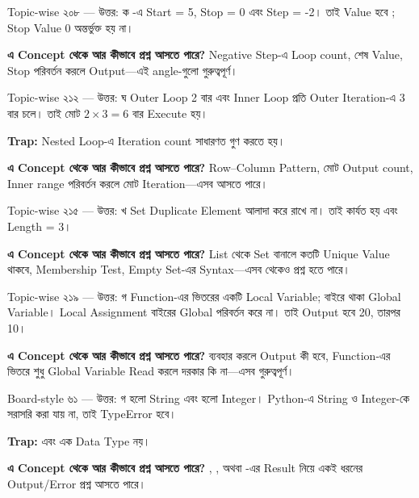 \begin{explainbox}{Topic-wise ২০৮ — উত্তর: ক}
-এ Start = 5, Stop = 0 এবং Step = -2। তাই Value হবে ; Stop Value 0 অন্তর্ভুক্ত হয় না।

\textbf{এ Concept থেকে আর কীভাবে প্রশ্ন আসতে পারে?} Negative Step-এ Loop count, শেষ Value, Stop পরিবর্তন করলে Output—এই angle-গুলো গুরুত্বপূর্ণ।
\end{explainbox}

\begin{explainbox}{Topic-wise ২১২ — উত্তর: ঘ}
Outer Loop 2 বার এবং Inner Loop প্রতি Outer Iteration-এ 3 বার চলে। তাই  মোট \(2 \times 3 = 6\) বার Execute হয়।

\textbf{Trap:} Nested Loop-এ Iteration count সাধারণত গুণ করতে হয়।

\textbf{এ Concept থেকে আর কীভাবে প্রশ্ন আসতে পারে?} Row–Column Pattern, মোট Output count, Inner range পরিবর্তন করলে মোট Iteration—এসব আসতে পারে।
\end{explainbox}

\begin{explainbox}{Topic-wise ২১৫ — উত্তর: খ}
Set Duplicate Element আলাদা করে রাখে না। তাই  কার্যত  হয় এবং Length = 3।

\textbf{এ Concept থেকে আর কীভাবে প্রশ্ন আসতে পারে?} List থেকে Set বানালে কতটি Unique Value থাকবে, Membership Test, Empty Set-এর Syntax—এসব থেকেও প্রশ্ন হতে পারে।
\end{explainbox}

\begin{explainbox}{Topic-wise ২১৯ — উত্তর: গ}
Function-এর ভিতরের  একটি Local Variable; বাইরে থাকা  Global Variable। Local Assignment বাইরের Global  পরিবর্তন করে না। তাই Output হবে 20, তারপর 10।

\textbf{এ Concept থেকে আর কীভাবে প্রশ্ন আসতে পারে?}  ব্যবহার করলে Output কী হবে, Function-এর ভিতরে শুধু Global Variable Read করলে  দরকার কি না—এসব গুরুত্বপূর্ণ।
\end{explainbox}

\begin{explainbox}{Board-style ৬১ — উত্তর: গ}
 হলো String এবং  হলো Integer। Python-এ String ও Integer-কে সরাসরি \py{+} করা যায় না, তাই TypeError হবে।

\textbf{Trap:}  এবং  এক Data Type নয়।

\textbf{এ Concept থেকে আর কীভাবে প্রশ্ন আসতে পারে?} , , অথবা -এর Result নিয়ে একই ধরনের Output/Error প্রশ্ন আসতে পারে।
\end{explainbox}

